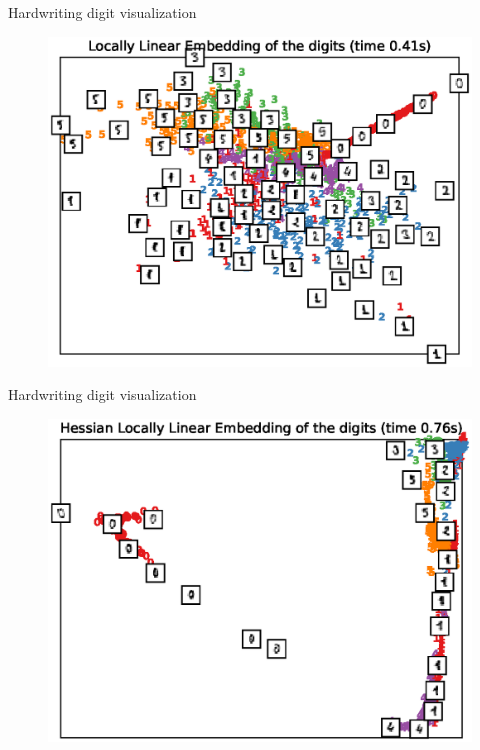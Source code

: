 \documentclass[10pt]{beamer}
\begin{document}
\begin{frame}{Hardwriting digit visualization}
\begin{figure}
\centering
\includegraphics[scale=0.65]{./image/experiment/lle.eps}
\end{figure}
\end{frame}

\begin{frame}{Hardwriting digit visualization}
\begin{figure}
\centering
\includegraphics[scale=0.65]{./image/experiment/hlle.eps}
\end{figure}
\end{frame}
\end{document}
